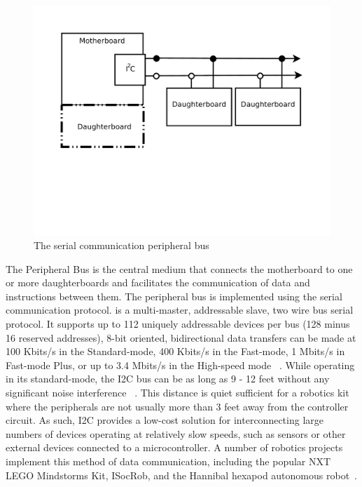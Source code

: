 	\begin{figure}[h]
	  \begin{center}
	    \includegraphics[width=1.0\columnwidth]{Figures/pbus.pdf}
	    \caption{The serial communication peripheral \iic bus}
	  \end{center}
	\end{figure}
	
	The Peripheral Bus is the central medium that connects the motherboard to one or more daughterboards and facilitates the communication of data and instructions between them. The peripheral bus is implemented using the \iic serial communication protocol. \iic is a multi-master, addressable slave, two wire bus serial protocol. It supports up to 112 uniquely addressable devices per bus (128 minus 16 reserved addresses), 8-bit oriented, bidirectional data transfers can be made at 100 Kbits/s in the Standard-mode, 400 Kbits/s in the Fast-mode, 1 Mbits/s in Fast-mode Plus, or up to 3.4 Mbits/s in the High-speed mode ~\parencite{edubots, i2cfaq}. While operating in its standard-mode, the I2C bus can be as long as 9 - 12 feet without any significant noise interference ~\parencite{Ferrell}. This distance is quiet sufficient for a robotics kit where the peripherals are not usually more than 3 feet away from the controller circuit. As such, I2C provides a low-cost solution for interconnecting large numbers of devices operating at relatively slow speeds, such as sensors or other external devices connected to a microcontroller. A number of robotics projects implement this method of data communication, including the popular NXT LEGO Mindstorms Kit, ISocRob, and the Hannibal hexapod autonomous robot~\parencite{Ferrell, hannibal, Ventura}.
	
